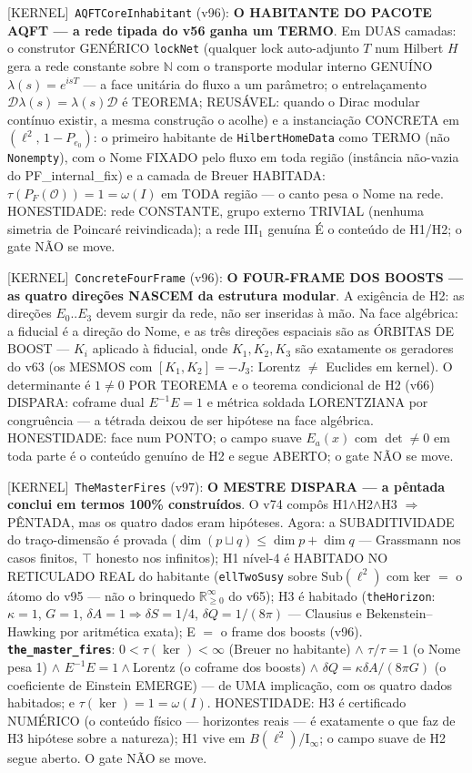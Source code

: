 \documentclass[11pt]{article}
\providecommand{\kernelmk}[1]{\textsf{[KERNEL]}~\texttt{#1}}\providecommand{\knownmk}[1]{\textsf{[KNOWN]}~{#1}}\providecommand{\statusmk}[1]{\textsf{[#1]}}
\theoremstyle{definition}\newtheorem{deriv}{Derivação}
\begin{document}
\kernelmk{AQFTCoreInhabitant} (v96): \textbf{O HABITANTE DO PACOTE AQFT --- a rede tipada do v56 ganha um TERMO}. Em DUAS camadas: o construtor GENÉRICO \texttt{lockNet} (qualquer lock auto-adjunto $T$ num Hilbert $H$ gera a rede constante sobre $\mathbb N$ com o transporte modular interno GENUÍNO $\lambda(s)=e^{isT}$ --- a face unitária do fluxo a um parâmetro; o entrelaçamento $\mathcal D\lambda(s)=\lambda(s)\mathcal D$ é TEOREMA; REUSÁVEL: quando o Dirac modular contínuo existir, a mesma construção o acolhe) e a instanciação CONCRETA em $(\ell^2,\,1-P_{e_0})$: o primeiro habitante de \texttt{HilbertHomeData} como TERMO (não \texttt{Nonempty}), com o Nome FIXADO pelo fluxo em toda região (instância não-vazia do PF\_internal\_fix) e a camada de Breuer HABITADA: $\tau(P_F(\mathcal O))=1=\omega(I)$ em TODA região --- o canto pesa o Nome na rede. HONESTIDADE: rede CONSTANTE, grupo externo TRIVIAL (nenhuma simetria de Poincaré reivindicada); a rede III$_1$ genuína É o conteúdo de H1/H2; o gate NÃO se move.

\kernelmk{ConcreteFourFrame} (v96): \textbf{O FOUR-FRAME DOS BOOSTS --- as quatro direções NASCEM da estrutura modular}. A exigência de H2: as direções $E_0..E_3$ devem surgir da rede, não ser inseridas à mão. Na face algébrica: a fiducial é a direção do Nome, e as três direções espaciais são as ÓRBITAS DE BOOST --- $K_i$ aplicado à fiducial, onde $K_1,K_2,K_3$ são exatamente os geradores do v63 (os MESMOS com $[K_1,K_2]=-J_3$: Lorentz $\neq$ Euclides em kernel). O determinante é $1\neq0$ POR TEOREMA e o teorema condicional de H2 (v66) DISPARA: coframe dual $E^{-1}E=1$ e métrica soldada LORENTZIANA por congruência --- a tétrada deixou de ser hipótese na face algébrica. HONESTIDADE: face num PONTO; o campo suave $E_a(x)$ com $\det\neq0$ em toda parte é o conteúdo genuíno de H2 e segue ABERTO; o gate NÃO se move.

\kernelmk{TheMasterFires} (v97): \textbf{O MESTRE DISPARA --- a pêntada conclui em termos 100\% construídos}. O v74 compôs H1$\wedge$H2$\wedge$H3 $\Rightarrow$ PÊNTADA, mas os quatro dados eram hipóteses. Agora: a SUBADITIVIDADE do traço-dimensão é provada ($\dim(p\sqcup q)\le\dim p+\dim q$ --- Grassmann nos casos finitos, $\top$ honesto nos infinitos); H1 nível-4 é HABITADO NO RETICULADO REAL do habitante (\texttt{ellTwoSusy} sobre $\mathrm{Sub}(\ell^2)$ com ker $=$ o átomo do v95 --- não o brinquedo $\mathbb R_{\ge0}^\infty$ do v65); H3 é habitado (\texttt{theHorizon}: $\kappa=1$, $G=1$, $\delta A=1\Rightarrow\delta S=1/4$, $\delta Q=1/(8\pi)$ --- Clausius e Bekenstein--Hawking por aritmética exata); E $=$ o frame dos boosts (v96). \textbf{\texttt{the\_master\_fires}}: $0<\tau(\ker)<\infty$ (Breuer no habitante) $\wedge$ $\tau/\tau=1$ (o Nome pesa 1) $\wedge$ $E^{-1}E=1\wedge$Lorentz (o coframe dos boosts) $\wedge$ $\delta Q=\kappa\delta A/(8\pi G)$ (o coeficiente de Einstein EMERGE) --- de UMA implicação, com os quatro dados habitados; e $\tau(\ker)=1=\omega(I)$. HONESTIDADE: H3 é certificado NUMÉRICO (o conteúdo físico --- horizontes reais --- é exatamente o que faz de H3 hipótese sobre a natureza); H1 vive em $B(\ell^2)$/I$_\infty$; o campo suave de H2 segue aberto. O gate NÃO se move.
\end{document}
